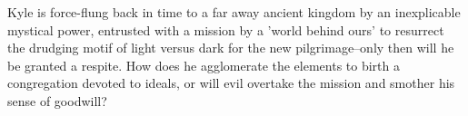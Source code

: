  Kyle is force-flung back in time to a far away ancient kingdom by an inexplicable mystical power, entrusted with a mission by a 'world behind ours' to resurrect the drudging motif of light versus dark for the new pilgrimage--only then will he be granted a respite. How does he agglomerate the elements to birth a congregation devoted to ideals, or will evil overtake the mission and smother his sense of goodwill?